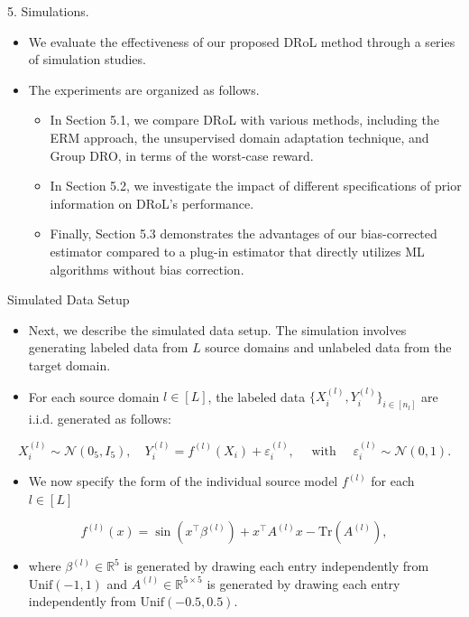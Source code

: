 \documentclass{beamer}
\begin{document}
\begin{frame}{5. Simulations.}
    \begin{itemize}
        \item We evaluate the effectiveness of our proposed DRoL method through a series of simulation studies.
        \item The experiments are organized as follows.
        \begin{itemize}
            \item In Section 5.1, we compare DRoL with various methods, including the ERM approach, the unsupervised domain adaptation technique, and Group DRO, in terms of the worst-case reward.
            \item In Section 5.2, we investigate the impact of different specifications of prior information on DRoL’s performance.
            \item Finally, Section 5.3 demonstrates the advantages of our bias-corrected estimator compared to a plug-in estimator that directly utilizes ML algorithms without bias correction.
        \end{itemize}
    \end{itemize}
\end{frame}

\begin{frame}{Simulated Data Setup}
    \begin{itemize}
        \item Next, we describe the simulated data setup. The simulation involves generating labeled data from $L$ source domains and unlabeled data from the target domain.
        \item For each source domain $l \in [L]$, the labeled data $\{ X_{i}^{(l)}, Y_{i}^{(l)} \}_{i \in [n_{l}]}$ are i.i.d. generated as follows:
    \end{itemize}
    \begin{equation*}
        X_{i}^{(l)} \sim \mathcal{N} (0_{5}, I_{5}), \quad Y_{i}^{(l)} = f^{(l)} (X_{i}) + \varepsilon_{i}^{(l)}, \quad \text{ with } \quad \varepsilon_{i}^{(l)} \sim \mathcal{N} (0, 1).
    \end{equation*}
    \begin{itemize}
        \item We now specify the form of the individual source model $f^{(l)}$ for each $l \in [L]$
    \end{itemize}
    \begin{equation*}
        f^{(l)} (x) = \sin (x ^{\intercal} \beta^{(l)}) + x ^{\intercal} A^{(l)} x - \mathrm{Tr} (A^{(l)}), \tag{5.1}
    \end{equation*}
    \begin{itemize}
        \item where $\beta^{(l)} \in \mathbb{R}^{5}$ is generated by drawing each entry independently from $\mathrm{Unif}(-1, 1)$ and $A^{(l)} \in \mathbb{R}^{5 \times 5}$ is generated by drawing each entry independently from $\mathrm{Unif}(-0.5, 0.5)$.
    \end{itemize}
\end{frame}
\end{document}
